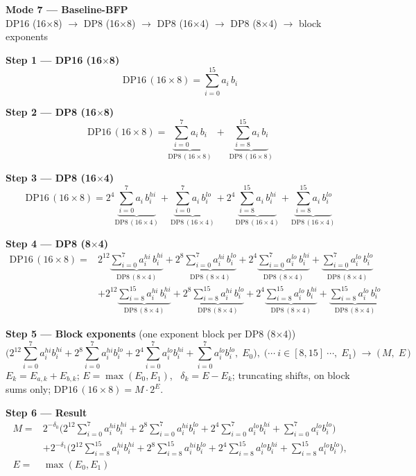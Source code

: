 \documentclass[fleqn]{article}
\newcommand{\DPop}[3]{\mathrm{DP#1}\,(#2\!\times\!#3)}
\begin{document}
\begin{center}
{\LARGE \textbf{Mode 7 --- Baseline-BFP}}\\[4pt]
{\large DP16 (16$\times$8) $\rightarrow$ DP8 (16$\times$8) $\rightarrow$ DP8 (16$\times$4) $\rightarrow$ DP8 (8$\times$4) $\rightarrow$ block exponents}
\end{center}

\vspace{0.3em}

\textbf{Step 1 --- DP16 (16$\times$8)}
\[ \DPop{16}{16}{8} = \sum_{i=0}^{15} a_i \, b_i \]

\textbf{Step 2 --- DP8 (16$\times$8)}
\[
\DPop{16}{16}{8}
  = \underbrace{\sum_{i=0}^{7} a_i \, b_i}_{\DPop{8}{16}{8}}
  \; + \; \underbrace{\sum_{i=8}^{15} a_i \, b_i}_{\DPop{8}{16}{8}}
\]

\textbf{Step 3 --- DP8 (16$\times$4)}
\[
\DPop{16}{16}{8}
  = 2^{4} \underbrace{\sum_{i=0}^{7} a_i \, b_i^{hi}}_{\DPop{8}{16}{4}}
  + \underbrace{\sum_{i=0}^{7} a_i \, b_i^{lo}}_{\DPop{8}{16}{4}}
  + 2^{4} \underbrace{\sum_{i=8}^{15} a_i \, b_i^{hi}}_{\DPop{8}{16}{4}}
  + \underbrace{\sum_{i=8}^{15} a_i \, b_i^{lo}}_{\DPop{8}{16}{4}}
\]

\textbf{Step 4 --- DP8 (8$\times$4)}
\begin{align*}
\DPop{16}{16}{8} = {}
  & 2^{12} \underbrace{\sum_{i=0}^{7} a_i^{hi} \, b_i^{hi}}_{\DPop{8}{8}{4}}
  + 2^{8} \underbrace{\sum_{i=0}^{7} a_i^{hi} \, b_i^{lo}}_{\DPop{8}{8}{4}}
  + 2^{4} \underbrace{\sum_{i=0}^{7} a_i^{lo} \, b_i^{hi}}_{\DPop{8}{8}{4}}
  + \underbrace{\sum_{i=0}^{7} a_i^{lo} \, b_i^{lo}}_{\DPop{8}{8}{4}} \\[0.3em]
  & + 2^{12} \underbrace{\sum_{i=8}^{15} a_i^{hi} \, b_i^{hi}}_{\DPop{8}{8}{4}}
  + 2^{8} \underbrace{\sum_{i=8}^{15} a_i^{hi} \, b_i^{lo}}_{\DPop{8}{8}{4}}
  + 2^{4} \underbrace{\sum_{i=8}^{15} a_i^{lo} \, b_i^{hi}}_{\DPop{8}{8}{4}}
  + \underbrace{\sum_{i=8}^{15} a_i^{lo} \, b_i^{lo}}_{\DPop{8}{8}{4}}
\end{align*}

\textbf{Step 5 --- Block exponents}\quad
{\small(one exponent block per DP8 (8$\times$4))}
\[
\Big(2^{12}\!\sum_{i=0}^{7} a_i^{hi} b_i^{hi} + 2^{8}\!\sum_{i=0}^{7} a_i^{hi} b_i^{lo} + 2^{4}\!\sum_{i=0}^{7} a_i^{lo} b_i^{hi} + \sum_{i=0}^{7} a_i^{lo} b_i^{lo},\; E_0\Big) ,\;
\Big(\cdots\ i\!\in\![8,15]\ \cdots,\; E_1\Big)
\;\longrightarrow\;
\Big(\, M ,\; E \,\Big)
\]
$E_k=E_{a,k}+E_{b,k}$; \quad $E=\max(E_0,E_1)$, \ $\delta_k=E-E_k$; \quad truncating shifts, on block sums only; \quad $\DPop{16}{16}{8}=M\cdot2^{E}$.

\textbf{Step 6 --- Result}
\[
\boxed{\;
\begin{aligned}
M ={}& 2^{-\delta_0}\Big(2^{12}\!\sum_{i=0}^{7} a_i^{hi} b_i^{hi} + 2^{8}\!\sum_{i=0}^{7} a_i^{hi} b_i^{lo} + 2^{4}\!\sum_{i=0}^{7} a_i^{lo} b_i^{hi} + \sum_{i=0}^{7} a_i^{lo} b_i^{lo}\Big) \\
  & + 2^{-\delta_1}\Big(2^{12}\!\sum_{i=8}^{15} a_i^{hi} b_i^{hi} + 2^{8}\!\sum_{i=8}^{15} a_i^{hi} b_i^{lo} + 2^{4}\!\sum_{i=8}^{15} a_i^{lo} b_i^{hi} + \sum_{i=8}^{15} a_i^{lo} b_i^{lo}\Big), \\[0.3em]
E ={}& \max(E_0,E_1)
\end{aligned}
\;}
\]
\end{document}
